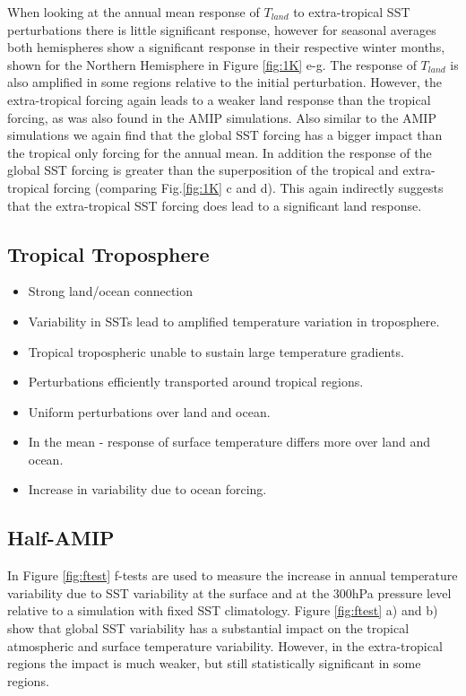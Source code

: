 When looking at the annual mean response of $T_{land}$ to extra-tropical SST 
perturbations there is little significant response, however for seasonal 
averages both hemispheres show a significant response in their respective winter 
months, shown for the Northern Hemisphere in Figure \ref{fig:1K} e-g. The 
response of $T_{land}$ is also amplified in some regions relative to the initial 
perturbation.  However, the extra-tropical forcing again leads to a weaker land 
response than the tropical forcing, as was also found in the AMIP simulations.  
Also similar to the AMIP simulations we again find that the  global SST forcing 
has a bigger impact than the tropical only forcing for the annual mean. In 
addition the response of the global SST forcing is greater than the 
superposition of the tropical and extra-tropical forcing (comparing 
Fig.\ref{fig:1K} c and d).  This again indirectly suggests that the 
extra-tropical SST forcing does lead to a significant land response.


\subsection{Tropical Troposphere}
\begin{itemize}
	\item Strong land/ocean connection
	\item Variability in SSTs lead to amplified temperature variation in 
		troposphere.
	\item Tropical tropospheric unable to sustain large temperature gradients.
	\item Perturbations efficiently transported around tropical regions.
	\item Uniform perturbations over land and ocean.
	\item In the mean - response of surface temperature differs more over land 
		and ocean.
	\item Increase in variability due to ocean forcing.
\end{itemize}

\subsection{Half-AMIP}

In Figure \ref{fig:ftest} f-tests are used to measure the increase in annual 
temperature variability due to SST variability at the surface and at the 300hPa 
pressure level relative to a simulation with fixed SST climatology. Figure  
\ref{fig:ftest} a) and b) show that global SST variability has a substantial 
impact on the tropical atmospheric and surface temperature variability. However, 
in the extra-tropical regions the impact is much weaker, but still statistically 
significant in some regions.

